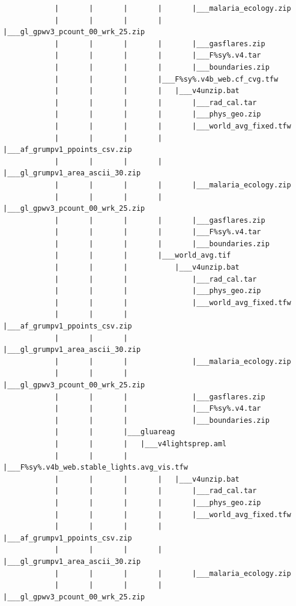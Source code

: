 \documentclass[
]{book}
\begin{document}
\begin{verbatim}
            |       |       |       |       |___malaria_ecology.zip
            |       |       |       |       |___gl_gpwv3_pcount_00_wrk_25.zip
            |       |       |       |       |___gasflares.zip
            |       |       |       |       |___F%sy%.v4.tar
            |       |       |       |       |___boundaries.zip
            |       |       |       |___F%sy%.v4b_web.cf_cvg.tfw
            |       |       |       |   |___v4unzip.bat
            |       |       |       |       |___rad_cal.tar
            |       |       |       |       |___phys_geo.zip
            |       |       |       |       |___world_avg_fixed.tfw
            |       |       |       |       |___af_grumpv1_ppoints_csv.zip
            |       |       |       |       |___gl_grumpv1_area_ascii_30.zip
            |       |       |       |       |___malaria_ecology.zip
            |       |       |       |       |___gl_gpwv3_pcount_00_wrk_25.zip
            |       |       |       |       |___gasflares.zip
            |       |       |       |       |___F%sy%.v4.tar
            |       |       |       |       |___boundaries.zip
            |       |       |       |___world_avg.tif
            |       |       |           |___v4unzip.bat
            |       |       |               |___rad_cal.tar
            |       |       |               |___phys_geo.zip
            |       |       |               |___world_avg_fixed.tfw
            |       |       |               |___af_grumpv1_ppoints_csv.zip
            |       |       |               |___gl_grumpv1_area_ascii_30.zip
            |       |       |               |___malaria_ecology.zip
            |       |       |               |___gl_gpwv3_pcount_00_wrk_25.zip
            |       |       |               |___gasflares.zip
            |       |       |               |___F%sy%.v4.tar
            |       |       |               |___boundaries.zip
            |       |       |___gluareag
            |       |       |   |___v4lightsprep.aml
            |       |       |       |___F%sy%.v4b_web.stable_lights.avg_vis.tfw
            |       |       |       |   |___v4unzip.bat
            |       |       |       |       |___rad_cal.tar
            |       |       |       |       |___phys_geo.zip
            |       |       |       |       |___world_avg_fixed.tfw
            |       |       |       |       |___af_grumpv1_ppoints_csv.zip
            |       |       |       |       |___gl_grumpv1_area_ascii_30.zip
            |       |       |       |       |___malaria_ecology.zip
            |       |       |       |       |___gl_gpwv3_pcount_00_wrk_25.zip

\end{verbatim}
\end{document}
